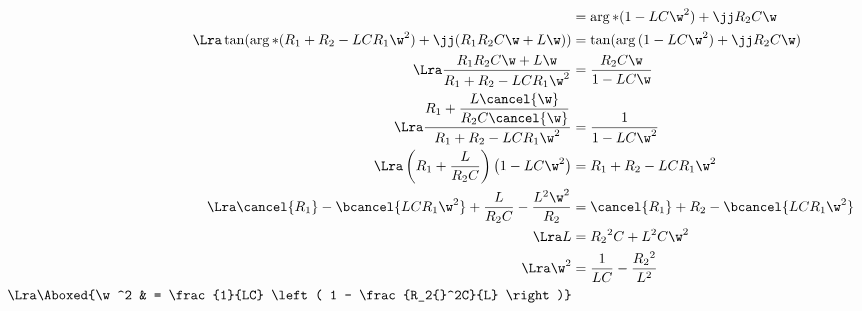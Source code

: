 \documentclass[../TDE6_rsf.tex]{subfiles}%
\begin{document}
{\begin{align*}
		 & = \arg*{(1-LC\w^2) + \jj R_2C\w}                      \\
		\Lra
		\tan (\arg*{(R_1 + R_2 - LCR_1\w^2) + \jj(R_1R_2C\w + L\w)})
		 & = \tan(\arg{(1-LC\w^2) + \jj R_2C\w} )                \\
		\Lra
		\frac{R_1R_2C\w + L\w}{R_1 + R_2 - LCR_1\w^2}
		 & = \frac{R_2C\w}{1-LC\w}                               \\
		\Lra
		\frac{R_1 + \dfrac{L\cancel{\w}}{R_2C\cancel{\w}}}{R_1 + R_2 - LCR_1\w^2}
		 & = \frac{1}{1-LC\w^2}                                  \\
		\Lra
		\left( R_1 + \frac{L}{R_2C} \right) \left( 1-LC\w^2 \right)
		 & = R_1 + R_2 - LCR_1\w^2                               \\
		\Lra
		\cancel{R_1} - \bcancel{LCR_1\w^2} + \frac{L}{R_2C} - \frac{L^2\w^2}{R_2}
		 & = \cancel{R_1} + R_2 - \bcancel{LCR_1\w^2}            \\
		\Lra
		L
		 & = R_2{}^2 C + L^2C\w^2                                \\
		\Lra
		\w^2
		 & = \frac{1}{LC} - \frac{R_2{}^2}{L^2}                  \\
		\Lra
		\Aboxed{\w^2
		 & = \frac{1}{LC} \left( 1 - \frac{R_2{}^2C}{L} \right)}
	\end{align*}
}
\end{document}
